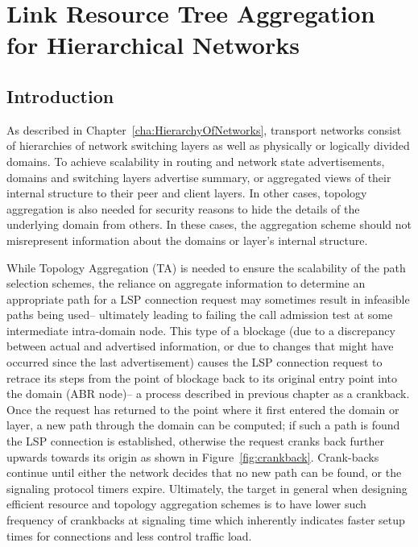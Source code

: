 \chapter{Link Resource Tree Aggregation for Hierarchical Networks}
\label{chap:HierarchyRTAggregation}

\section{Introduction}
As described in Chapter~\ref{cha:HierarchyOfNetworks}, transport networks consist of hierarchies of network switching layers as well as physically or logically divided domains. To achieve scalability in routing and network state advertisements, domains and switching layers advertise summary, or aggregated views of their internal structure to their peer and client layers. In other cases, topology aggregation is also needed for security reasons to hide the details of the underlying domain from others. In these cases, the aggregation scheme should not misrepresent information about the domains or layer's internal structure.

While Topology Aggregation (TA) is needed to ensure the scalability of the path selection schemes, the reliance on aggregate information to determine an appropriate path for a LSP connection request may sometimes result in infeasible paths being used-- ultimately leading to failing the call admission test at some intermediate intra-domain node. This type of a blockage (due to a discrepancy between actual and advertised information, or due to changes that might have occurred since the last advertisement) causes the LSP connection request to retrace its steps from the point of blockage back to its original entry point into the domain (\eg ABR node)-- a process described in previous chapter as a crankback. Once the request has returned to the point where it first entered the domain or layer, a new path through the domain can be computed; if such a path is found the LSP connection is established, otherwise the request cranks back further upwards towards its origin as shown in Figure~\ref{fig:crankback}. Crank-backs continue until either the network decides that no new path can be found, or the signaling protocol timers expire. Ultimately, the target in general when designing efficient resource and topology aggregation schemes is to have lower such frequency of crankbacks at signaling time which inherently indicates faster setup times for connections and less control traffic load.

